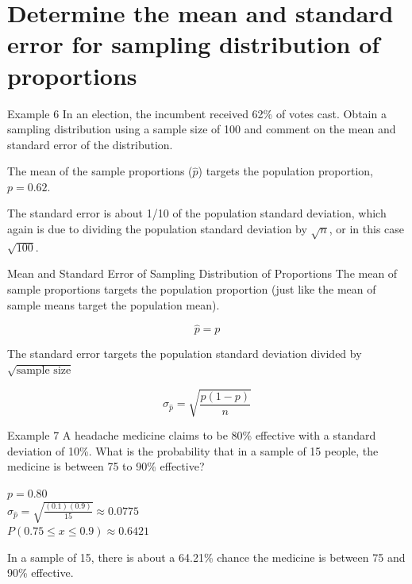 \documentclass[t]{beamer}
\begin{document}
\section{Determine the mean and standard error for sampling distribution of proportions}

\begin{frame}{Example 6}
In an election, the incumbent received 62\% of votes cast. Obtain a sampling distribution using a sample size of 100 and comment on the mean and standard error of the distribution.	\newline\\	\pause

The mean of the sample proportions ($\hat{p}$) targets the population proportion, $p = 0.62$.	\newline\\	\pause

The standard error is about 1/10 of the population standard deviation, which again is due to dividing the population standard deviation by $\sqrt{n}$, or in this case $\sqrt{100}$.
\end{frame}

\begin{frame}{Mean and Standard Error of Sampling Distribution of Proportions}
The mean of sample proportions targets the population proportion (just like the mean of sample means target the population mean).	\pause

\[\hat{p} = p\]	\pause

The standard error targets the population standard deviation divided by $\sqrt{\text{sample size}}$	\pause

\[\sigma_{\hat{p}} = \sqrt{\frac{p(1-p)}{n}}\]
\end{frame}


\begin{frame}{Example 7}
A headache medicine claims to be 80\% effective with a standard deviation of 10\%. What is the probability that in a sample of 15 people, the medicine is between 75 to 90\% effective?	\newline\\	\pause

$p = 0.80$	\newline\\	\pause
$\sigma_{\hat{p}} = \sqrt{\frac{(0.1)(0.9)}{15}} \approx 0.0775$	\newline\\	\pause
$P(0.75 \leq x \leq 0.9) \approx 0.6421$	\newline\\	\pause

In a sample of 15, there is about a 64.21\% chance the medicine is between 75 and 90\% effective.
\end{frame}
\end{document}
